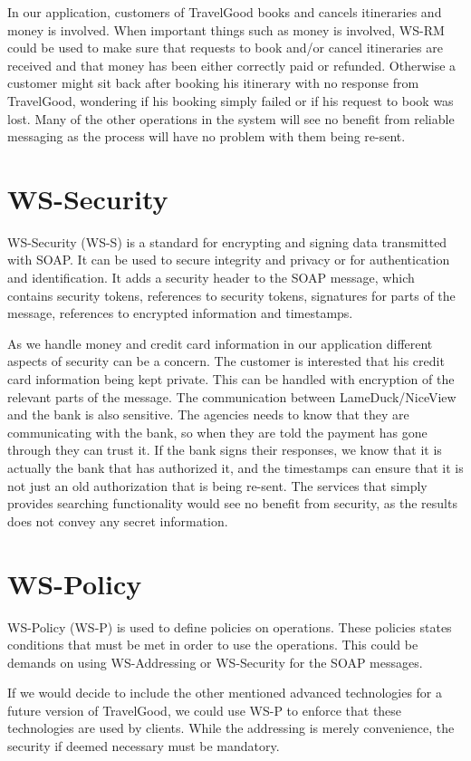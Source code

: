 In our application, customers of TravelGood books and cancels itineraries and money is involved. When important things such as money is involved, WS-RM could be used to make sure that requests to book and/or cancel itineraries are received and that money has been either correctly paid or refunded. Otherwise a customer might sit back after booking his itinerary with no response from TravelGood, wondering if his booking simply failed or if his request to book was lost. Many of the other operations in the system will see no benefit from reliable messaging as the process will have no problem with them being re-sent.


\section{WS-Security}
\kim

\noindent
WS-Security (WS-S) is a standard for encrypting and signing data transmitted with SOAP. It can be used to secure integrity and privacy or for authentication and identification. It adds a security header to the SOAP message, which contains security tokens, references to security tokens, signatures for parts of the message, references to encrypted information and timestamps.

As we handle money and credit card information in our application different aspects of security can be a concern. The customer is interested that his credit card information being kept private. This can be handled with encryption of the relevant parts of the message. The communication between LameDuck/NiceView and the bank is also sensitive. The agencies needs to know that they are communicating with the bank, so when they are told the payment has gone through they can trust it. If the bank signs their responses, we know that it is actually the bank that has authorized it, and the timestamps can ensure that it is not just an old authorization that is being re-sent. The services that simply provides searching functionality would see no benefit from security, as the results does not convey any secret information.

\section{WS-Policy}
\pet

\noindent
WS-Policy (WS-P) is used to define policies on operations. These policies states conditions that must be met in order to use the operations. This could be demands on using WS-Addressing or WS-Security for the SOAP messages.

If we would decide to include the other mentioned advanced technologies for a future version of TravelGood, we could use WS-P to enforce that these technologies are used by clients. While the addressing is merely convenience, the security if deemed necessary must be mandatory.



